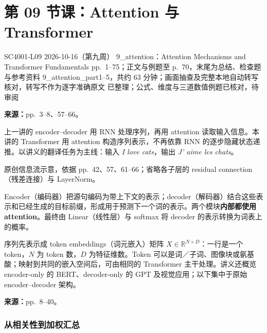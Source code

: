 
\section{第 09 节课：Attention 与 Transformer}
\label{lecture:SC4001-L09}

\lecturemeta
  {SC4001-L09}
  {2026-10-16（第九周）}
  {9\_attention：Attention Mechanisms and Transformer Fundamentals}
  {pp.~1--75；正文与例题至 p.~70，末尾为总结、检查题与参考资料}
  {9\_attention\_part1--5，共约 63 分钟；画面抽查及完整本地自动转写核对，转写不作为逐字准确原文}
  {已整理；公式、维度与三道数值例题已核对，待审阅}


\textbf{来源：}pp.~3--8、57--66。

上一讲的 encoder--decoder 用 RNN 处理序列，再用 attention 读取输入信息。本讲的 Transformer 用 attention 构造序列表示，不再依靠 RNN 的逐步隐藏状态递推。以讲义的翻译任务为主线：输入 \emph{I love cats}，输出 \emph{J' aime les chats}。

\begin{center}

\end{center}
{\small 原创信息流示意，依据 pp.~42、57、61--66；省略各子层的 residual connection（残差连接）与 LayerNorm。}

Encoder（编码器）把源句编码为带上下文的表示；decoder（解码器）结合这些表示和已经生成的目标前缀，形成用于预测下一个词的表示。两个模块\textbf{内部都使用 attention}。最终由 Linear（线性层）与 softmax 将 decoder 的表示转换为词表上的概率。

序列先表示成 token embeddings（词元嵌入）矩阵 $X\in\mathbb R^{N\times D}$：一行是一个 token，$N$ 为 token 数，$D$ 为特征维数。Token 可以是词／子词、图像块或氨基酸；映射到共同的嵌入空间后，可由相同的 Transformer 主干处理。讲义还概览 encoder-only 的 BERT、decoder-only 的 GPT 及视觉应用；以下集中于原始 encoder--decoder 架构。


\textbf{来源：}pp.~8--40。

\subsubsection{从相关性到加权汇总}

